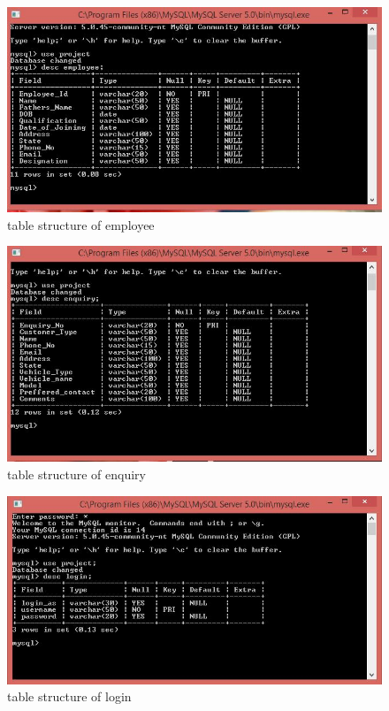 \begin{figure}[ht]
\begin{center}
\includegraphics[scale=0.5]{images/t6.jpg}
\end{center}
\caption{table structure of employee}
\label{table structure of employee}
\end{figure}


\begin{figure}[ht]
\begin{center}
\includegraphics[scale=0.5]{images/t7.jpg}
\end{center}
\caption{table structure of enquiry}
\label{table structure of enquiry}
\end{figure}


\begin{figure}[ht]
\begin{center}
\includegraphics[scale=0.5]{images/t8.jpg}
\end{center}
\caption{table structure of login}
\label{table structure of login}
\end{figure}


